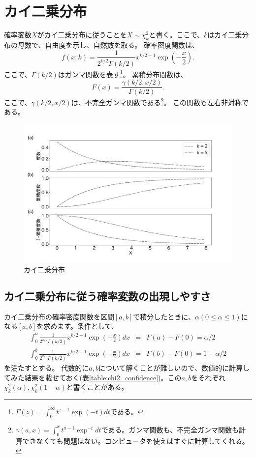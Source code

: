 \section{カイ二乗分布}
確率変数$X$がカイ二乗分布に従うことを$X \sim \chi^2_k$と書く。ここで、$k$はカイ二乗分布の母数で、自由度を示し、自然数を取る。
確率密度関数は、
\begin{equation*}
    f(x;k) = \frac{1}{2^{k/2}\Gamma(k/2)}x^{k/2-1}\exp\left(-\frac{x}{2}\right).
\end{equation*}
ここで、$\Gamma(k/2)$はガンマ関数を表す\footnote{$ \Gamma(z)=\int_0^{\infty }t^{z-1}\exp(-t)dt$である。 }。
累積分布間数は、
\begin{equation*}
    F(x) = \frac{\gamma(k/2,x/2)}{\Gamma(k/2)}.
\end{equation*}
ここで、$\gamma(k/2,x/2)$は、不完全ガンマ関数である\footnote{$\gamma(a,x)=\int_0^x t^{a-1}\exp^{-t}dt$である。ガンマ関数も、不完全ガンマ関数も計算できなくても問題はない。コンピュータを使えばすぐに計算してくれる。}。
この関数も左右非対称である。


\begin{figure}
    \begin{center}
        \includegraphics[width=15cm]{./image/02_/chi2_frequency.pdf}
        \caption{カイ二乗分布}
        \label{chi2_}
    \end{center}
\end{figure}

\subsection{カイ二乗分布に従う確率変数の出現しやすさ}
カイ二乗分布の確率密度関数を区間$[a,b]$で積分したときに、$\alpha(0\leq \alpha \leq 1)$になる$[a,b]$を求めます。条件として、
\begin{eqnarray*}
    \int_0^{a}  \frac{1}{2^{k/2}\Gamma(k/2)}x^{k/2-1}\exp\left(-\frac{x}{2}\right)dx &=& F(a)-F(0) = \alpha/2\\
    \int_0^{b} \frac{1}{2^{k/2}\Gamma(k/2)}x^{k/2-1}\exp\left(-\frac{x}{2}\right)dx &=& F(b)-F(0)= 1-\alpha/2
\end{eqnarray*}
を満たすとする。
代数的に$a,b$について解くことが難しいので、数値的に計算してみた結果を載せておく(表\ref{table:chi2_confidence})。この$a,b$をそれぞれ$\chi^2_k(\alpha),\chi^2_{k}(1-\alpha)$と書くことがある。


